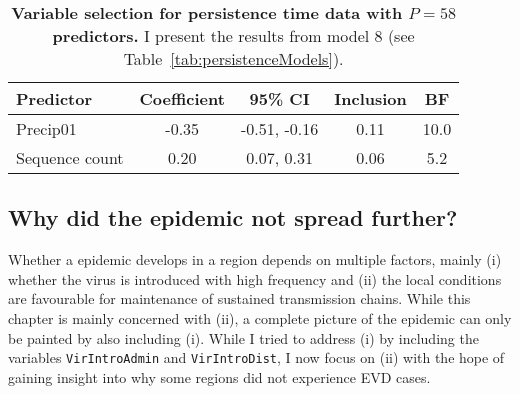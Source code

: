 \begin{minipage}{\textwidth}    
\setcounter{mpfootnote}{\value{footnote}}
\renewcommand{\thempfootnote}{\arabic{mpfootnote}}
\fontsize{9}{11}\selectfont
{}
\begin{longtable}{lcccc}
\caption[Variable selection for persistence time data with $P = 58$ predictors.]{\textbf{Variable selection for persistence time data with $P = 58$ predictors.}
I present the results from model 8 (see Table~\ref{tab:persistenceModels}).}
\label{tab:persistence_bigP_results}\\
\toprule
Predictor\footnotemark[1] & Coefficient\footnotemark[2] & 95\% CI\footnotemark[3] & Inclusion\footnotemark[4] & BF\footnotemark[5] \\
\toprule
Precip01 & -0.35 & -0.51, -0.16 & 0.11 & 10.0 \\
\hline
Sequence count & 0.20 & 0.07, 0.31 & 0.06 & 5.2\\
\bottomrule
\end{longtable}
\setcounter{footnote}{\value{mpfootnote}}
\end{minipage}

\subsection*{Why did the epidemic not spread further?}

Whether a epidemic develops in a region depends on multiple factors, mainly (i) whether the virus is introduced with high frequency and (ii) the local conditions are favourable for maintenance of sustained transmission chains.
While this chapter is mainly concerned with (ii), a complete picture of the epidemic can only be painted by also including (i).
While I tried to address (i) by including the variables \verb|VirIntroAdmin| and \verb|VirIntroDist|, I now focus on (ii) with the hope of gaining insight into why some regions did not experience EVD cases.

